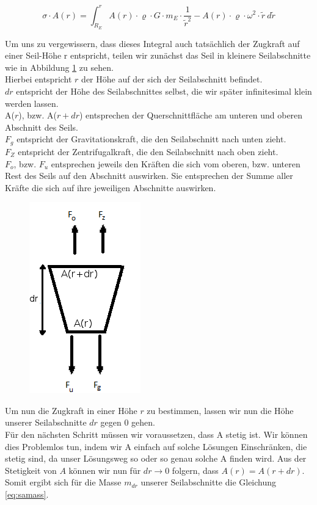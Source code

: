 \documentclass[a4paper, 10pt]{report}
\begin{document}
\begin{equation}
\sigma \cdot A(r) = \int_{R_E}^{r} A(r) \cdot \varrho \cdot G \cdot m_E \cdot \frac{1}{\tilde{r}^2} - A(r) \cdot \varrho \cdot \omega^2 \cdot \tilde{r}\ d\tilde{r}
\label{eq:taperint}
\end{equation}

Um uns zu vergewissern, dass dieses Integral auch tatsächlich der Zugkraft auf einer Seil-Höhe r entspricht, teilen wir zunächst das Seil in kleinere Seilabschnitte wie in Abbildung \ref{fig:differential} zu sehen.\\
Hierbei entspricht $r$ der Höhe auf der sich der Seilabschnitt befindet.\\
$dr$ entspricht der Höhe des Seilabschnittes selbst, die wir später infinitesimal klein werden lassen.\\
A($r$), bzw. A($r+dr$) entsprechen der Querschnittfläche am unteren und oberen Abschnitt des Seils.\\
$F_g$ entspricht der Gravitationskraft, die den Seilabschnitt nach unten zieht.\\
$F_Z$ entspricht der Zentrifugalkraft, die den Seilabschnitt nach oben zieht.\\
$F_o$, bzw. $F_u$ entsprechen jeweils den Kräften die sich vom oberen, bzw. unteren Rest des Seils auf den Abschnitt auswirken. Sie entsprechen der Summe aller Kräfte die sich auf ihre jeweiligen Abschnitte auswirken.

\begin{figure}[!htb]
	\includegraphics{differential}
	\label{fig:differential}
\end{figure}

Um nun die Zugkraft in einer Höhe $r$ zu bestimmen, lassen wir nun die Höhe unserer Seilabschnitte $dr$ gegen 0 gehen.\\
Für den nächsten Schritt müssen wir voraussetzen, dass A stetig ist. Wir können dies Problemlos tun, indem wir A einfach auf solche Lösungen Einschränken, die stetig sind, da unser Lösungsweg so oder so genau solche A finden wird. Aus der Stetigkeit von $A$ können wir nun für $dr \rightarrow 0$ folgern, dass $A(r)=A(r+dr)$. Somit ergibt sich für die Masse $m_{dr}$ unserer Seilabschnitte die Gleichung \ref{eq:samass}.
\end{document}
